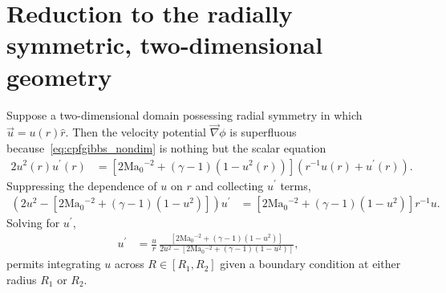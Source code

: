 \documentclass[letterpaper,11pt,nointlimits,reqno]{amsart}
\newcommand{\Mach}[1][]{\mbox{Ma}_{#1}}
\begin{document}
\section{Reduction to the radially symmetric, two-dimensional geometry}

Suppose a two-dimensional domain possessing radial symmetry in which
$\vec{u}={u}\!\left(r\right)\hat{r}$.  Then the velocity potential
$\vec{\nabla}\phi$ is superfluous because~\eqref{eq:cpfgibbs_nondim} is nothing
but the scalar equation
\begin{align}
       2 u^2\!\left(r\right) u^\prime\!\left(r\right)
    &=
       \left[
          2 \Mach[0]{}^{-2}
        + \left(\gamma-1\right) \left(1 - u^2\!\left(r\right)\right)
       \right]
       \left(
          r^{-1} u\!\left(r\right) + u^\prime\!\left(r\right)
       \right)
.
\end{align}
Suppressing the dependence of $u$ on $r$ and collecting $u^\prime$ terms,
\begin{align}
       \left(
           2 u^2
         - \left[
              2 \Mach[0]{}^{-2} + \left(\gamma-1\right) \left(1 - u^2\right)
           \right]
       \right)
       u^\prime
    &=
       \left[
          2 \Mach[0]{}^{-2} + \left(\gamma-1\right) \left(1 - u^2\right)
       \right]
       r^{-1} u
.
\end{align}
Solving for $u^\prime$,
\begin{align}
       u^\prime
    &=
       \frac{u}{r}
       \,
       \frac{
         \left[
            2 \Mach[0]{}^{-2} + \left(\gamma-1\right) \left(1 - u^2\right)
         \right]
       }{
           2 u^2
         - \left[
              2 \Mach[0]{}^{-2} + \left(\gamma-1\right) \left(1 - u^2\right)
           \right]
       }
\label{eq:cpfradial_nondim_ode}
,
\end{align}
permits integrating $u$ across $R\in\left[R_1, R_2\right]$ given a boundary
condition at either radius $R_1$ or $R_2$.
\end{document}
